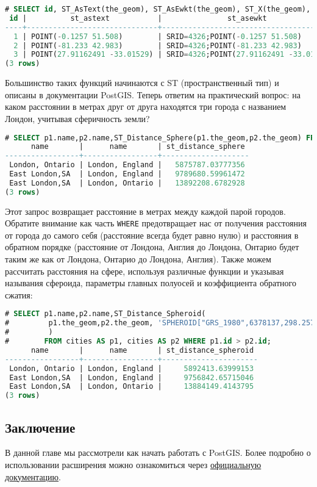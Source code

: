 \begin{lstlisting}[language=SQL,label=lst:postgisselectcities2,caption=SELECT cities]
# SELECT id, ST_AsText(the_geom), ST_AsEwkt(the_geom), ST_X(the_geom), ST_Y(the_geom) FROM cities;
 id |          st_astext           |               st_asewkt                |    st_x     |   st_y
----+------------------------------+----------------------------------------+-------------+-----------
  1 | POINT(-0.1257 51.508)        | SRID=4326;POINT(-0.1257 51.508)        |     -0.1257 |    51.508
  2 | POINT(-81.233 42.983)        | SRID=4326;POINT(-81.233 42.983)        |     -81.233 |    42.983
  3 | POINT(27.91162491 -33.01529) | SRID=4326;POINT(27.91162491 -33.01529) | 27.91162491 | -33.01529
(3 rows)
\end{lstlisting}

Большинство таких функций начинаются с ST (пространственный тип) и описаны в документации PostGIS. Теперь ответим на практический вопрос: на каком расстоянии в метрах друг от друга находятся три города с названием Лондон, учитывая сферичность земли?

\begin{lstlisting}[language=SQL,label=lst:postgisselectcities3,caption=Расстояние до Лондона]
# SELECT p1.name,p2.name,ST_Distance_Sphere(p1.the_geom,p2.the_geom) FROM cities AS p1, cities AS p2 WHERE p1.id > p2.id;
      name       |      name       | st_distance_sphere
-----------------+-----------------+--------------------
 London, Ontario | London, England |   5875787.03777356
 East London,SA  | London, England |   9789680.59961472
 East London,SA  | London, Ontario |   13892208.6782928
(3 rows)
\end{lstlisting}

Этот запрос возвращает расстояние в метрах между каждой парой городов. Обратите внимание как часть \lstinline!WHERE! предотвращает нас от получения расстояния от города до самого себя (расстояние всегда будет равно нулю) и расстояния в обратном порядке (расстояние от Лондона, Англия до Лондона, Онтарио будет таким же как от Лондона, Онтарио до Лондона, Англия). Также можем рассчитать расстояния на сфере, используя различные функции и указывая называния сфероида, параметры главных полуосей и коэффициента обратного сжатия:

\begin{lstlisting}[language=SQL,label=lst:postgisselectcities4,caption=Расстояние до Лондона]
# SELECT p1.name,p2.name,ST_Distance_Spheroid(
#         p1.the_geom,p2.the_geom, 'SPHEROID["GRS_1980",6378137,298.257222]'
#         )
#        FROM cities AS p1, cities AS p2 WHERE p1.id > p2.id;
      name       |      name       | st_distance_spheroid
-----------------+-----------------+----------------------
 London, Ontario | London, England |     5892413.63999153
 East London,SA  | London, England |     9756842.65715046
 East London,SA  | London, Ontario |     13884149.4143795
(3 rows)
\end{lstlisting}


\subsection{Заключение}

В данной главе мы рассмотрели как начать работать с PostGIS. Более подробно о использовании расширения можно ознакомиться через \href{http://postgis.net/documentation/}{официальную документацию}.
